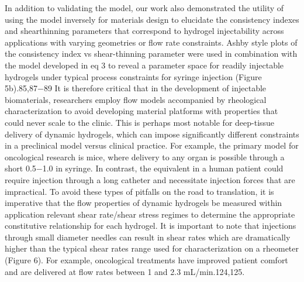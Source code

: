 \documentclass[../../main-notes.tex]{subfiles}
\begin{document}
In addition to validating the model, our work also demonstrated the utility of using the model inversely for materials design to elucidate the consistency indexes and shearthinning parameters that correspond to hydrogel injectability across applications with varying geometries or flow rate constraints. 
Ashby style plots of the consistency index vs shear-thinning parameter were used in combination with the model developed in eq 3 to reveal a parameter space for readily injectable hydrogels under typical process constraints for  syringe injection (Figure 5b).85,87−89 
It is therefore critical that in the development of injectable biomaterials, researchers employ flow models accompanied by rheological characterization to avoid developing material platforms with properties that could never scale to the clinic. 
This is perhaps most notable for deep-tissue delivery of dynamic hydrogels, which can impose significantly different constraints in a preclinical model versus clinical practice. 
For example, the primary model for oncological research is mice, where delivery to any organ is possible through a short 0.5−1.0 in syringe. 
In contrast, the equivalent in a human patient could require injection through a long catheter and necessitate injection forces that are impractical. 
To avoid these types of pitfalls on the road to translation, it is imperative that the flow properties of dynamic hydrogels be measured within application relevant shear rate/shear stress regimes to determine the appropriate constitutive relationship for each hydrogel. 
It is important to note that injections through small diameter needles can result in shear rates which are dramatically higher than the typical shear rates range used for characterization on a rheometer (Figure 6). 
For example, oncological treatments have improved patient comfort and are  delivered at flow rates between 1 and 2.3 mL/min.124,125.
\end{document}
